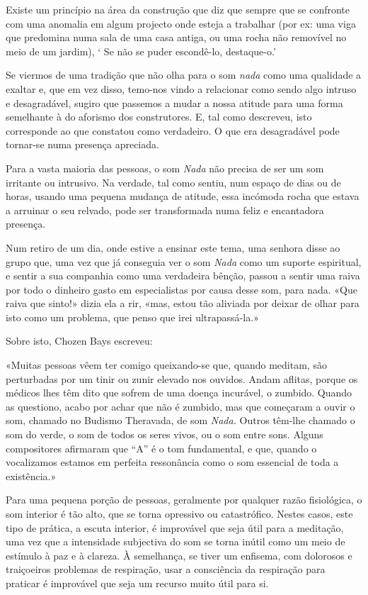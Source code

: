  Existe um princípio na área da construção que diz que sempre que se
confronte com uma anomalia em algum projecto onde esteja a trabalhar
(por ex: uma viga que predomina numa sala de uma casa antiga, ou uma
rocha não removível no meio de um jardim), ` Se não se puder escondê-lo,
destaque-o.'

Se viermos de uma tradição que não olha para o som \emph{nada} como uma
qualidade a exaltar e, que em vez disso, temo-nos vindo a relacionar
como sendo algo intruso e desagradável, sugiro que passemos a mudar a
nossa atitude para uma forma semelhante à do aforismo dos construtores.
E, tal como descreveu, isto corresponde ao que constatou como
verdadeiro. O que era desagradável pode tornar-se numa presença
apreciada.

Para a vasta maioria das pessoas, o som \emph{Nada} não precisa de ser
um som irritante ou intrusivo. Na verdade, tal como sentiu, num espaço
de dias ou de horas, usando uma pequena mudança de atitude, essa
incómoda rocha que estava a arruinar o seu relvado, pode ser
transformada numa feliz e encantadora presença.

Num retiro de um dia, onde estive a ensinar este tema, uma senhora disse
ao grupo que, uma vez que já conseguia ver o som \emph{Nada} como um
suporte espiritual, e sentir a sua companhia como uma verdadeira bênção,
passou a sentir uma raiva por todo o dinheiro gasto em especialistas por
causa desse som, para nada. «Que raiva que sinto!» dizia ela a rir,
«mas, estou tão aliviada por deixar de olhar para isto como um problema,
que penso que irei ultrapassá-la.»

Sobre isto, Chozen Bays escreveu:

«Muitas pessoas vêem ter comigo queixando-se que, quando meditam, são
perturbadas por um tinir ou zunir elevado nos ouvidos. Andam aflitas,
porque os médicos lhes têm dito que sofrem de uma doença incurável, o
zumbido. Quando as questiono, acabo por achar que não é zumbido, mas que
começaram a ouvir o som, chamado no Budismo Theravada, de som
\emph{Nada.} Outros têm-lhe chamado o som do verde, o som de todos os
seres vivos, ou o som entre sons. Alguns compositores afirmaram que
``A'' é o tom fundamental, e que, quando o vocalizamos estamos em
perfeita ressonância como o som essencial de toda a existência.»\cite{deep}

Para uma pequena porção de pessoas, geralmente por qualquer razão
fisiológica, o som interior é tão alto, que se torna opressivo ou
catastrófico. Nestes casos, este tipo de prática, a escuta interior, é
improvável que seja útil para a meditação, uma vez que a intensidade
subjectiva do som se torna inútil como um meio de estímulo à paz e à
clareza. À semelhança, se tiver um enfisema, com dolorosos e traiçoeiros
problemas de respiração, usar a consciência da respiração para praticar
é improvável que seja um recurso muito útil para si.

